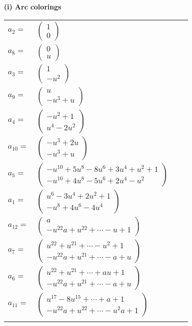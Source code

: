 \documentclass[1p]{elsarticle_modified}
\theoremstyle{definition}
\begin{document}
\flushleft \textbf{(i) Arc colorings}\\
\begin{tabular}{m{7pt} m{180pt} m{7pt} m{180pt} }
\flushright $a_{2}=$&$\begin{pmatrix}1\\0\end{pmatrix}$ \\
\flushright $a_{8}=$&$\begin{pmatrix}0\\u\end{pmatrix}$ \\
\flushright $a_{3}=$&$\begin{pmatrix}1\\- u^2\end{pmatrix}$ \\
\flushright $a_{9}=$&$\begin{pmatrix}u\\- u^3+u\end{pmatrix}$ \\
\flushright $a_{4}=$&$\begin{pmatrix}- u^2+1\\u^4-2 u^2\end{pmatrix}$ \\
\flushright $a_{10}=$&$\begin{pmatrix}- u^3+2 u\\- u^3+u\end{pmatrix}$ \\
\flushright $a_{5}=$&$\begin{pmatrix}- u^{10}+5 u^8-8 u^6+3 u^4+u^2+1\\- u^{10}+4 u^8-5 u^6+2 u^4- u^2\end{pmatrix}$ \\
\flushright $a_{1}=$&$\begin{pmatrix}u^6-3 u^4+2 u^2+1\\- u^8+4 u^6-4 u^4\end{pmatrix}$ \\
\flushright $a_{12}=$&$\begin{pmatrix}a\\- u^{22} a+u^{22}+\cdots- u+1\end{pmatrix}$ \\
\flushright $a_{7}=$&$\begin{pmatrix}u^{22}+u^{21}+\cdots- u^2+1\\- u^{22} a+u^{21}+\cdots- a+u\end{pmatrix}$ \\
\flushright $a_{6}=$&$\begin{pmatrix}u^{22}+u^{21}+\cdots+a u+1\\- u^{22} a+u^{21}+\cdots- a+u\end{pmatrix}$ \\
\flushright $a_{11}=$&$\begin{pmatrix}u^{17}-8 u^{15}+\cdots+a+1\\- u^{22} a+u^{22}+\cdots- u^2 a+1\end{pmatrix}$\\&\end{tabular}
\end{document}
